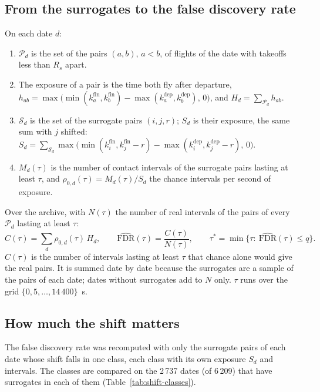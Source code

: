 \documentclass[11pt,a4paper]{article}
\begin{document}
\subsection{From the surrogates to the false discovery rate}\label{sec:fdr}

On each date $d$:
\begin{enumerate}[leftmargin=1.6em]
\item $\mathcal{P}_d$ is the set of the pairs $(a,b)$, $a<b$, of flights of the date with
  takeoffs less than $R_s$ apart.
\item The exposure of a pair is the time both fly after departure,
  $h_{ab}=\max\bigl(\min(k^\mathrm{fin}_a,k^\mathrm{fin}_b)-\max(k^\mathrm{dep}_a,k^\mathrm{dep}_b),\,0\bigr)$, and
  $H_d=\sum_{\mathcal{P}_d}h_{ab}$.
\item $\mathcal{S}_d$ is the set of the surrogate pairs $(i,j,r)$; $S_d$ is their exposure, the
  same sum with $j$ shifted:
  $S_d=\sum_{\mathcal{S}_d}\max\bigl(\min(k^\mathrm{fin}_i,k^\mathrm{fin}_j-r)-\max(k^\mathrm{dep}_i,k^\mathrm{dep}_j-r),\,0\bigr)$.
\item $M_d(\tau)$ is the number of contact intervals of the surrogate pairs lasting at least
  $\tau$, and $\rho_{0,d}(\tau)=M_d(\tau)/S_d$ the chance intervals per second of exposure.
\end{enumerate}
Over the archive, with $N(\tau)$ the number of real intervals of the pairs of every
$\mathcal{P}_d$ lasting at least $\tau$:
\begin{equation}\label{eq:fdr}
  C(\tau)=\sum_d \rho_{0,d}(\tau)\,H_d,\qquad
  \widehat{\mathrm{FDR}}(\tau)=\frac{C(\tau)}{N(\tau)},\qquad
  \tau^*=\min\bigl\{\tau:\ \widehat{\mathrm{FDR}}(\tau)\le q\bigr\}.
\end{equation}
$C(\tau)$ is the number of intervals lasting at least $\tau$ that chance alone would give the
real pairs. It is summed date by date because the surrogates are a sample of the pairs of each
date; dates without surrogates add to $N$ only. $\tau$ runs over the grid $\{0,5,\dots,14\,400\}$~s.

\subsection{How much the shift matters}\label{sec:shift-classes}

The false discovery rate was recomputed with only the surrogate pairs of each date whose shift
falls in one class, each class with its own exposure $S_d$ and intervals. The classes are
compared on the 2\,737 dates (of 6\,209) that have surrogates in each of them
(Table~\ref{tab:shift-classes}).
\end{document}
